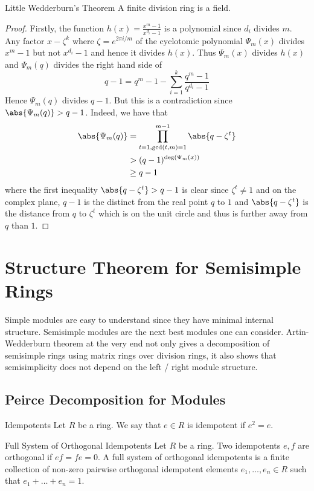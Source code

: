 \documentclass[a4paper]{article}
\begin{document}
\begin{thm}{Little Wedderburn's Theorem}{} A finite division ring is a field. \tcbline
\begin{proof}
Firstly, the function $h(x)=\frac{x^m-1}{x^{d_i}-1}$ is a polynomial since $d_i$ divides $m$. Any factor $x-\zeta^k$ where $\zeta=e^{2\pi i/m}$ of the cyclotomic polynomial $\Psi_m(x)$ divides $x^m-1$ but not $x^{d_i}-1$ and hence it divides $h(x)$. Thus $\Psi_m(x)$ divides $h(x)$ and $\Psi_m(q)$ divides the right hand side of $$q-1=q^m-1-\sum_{i=1}^k\frac{q^m-1}{q^{d_i}-1}$$ Hence $\Psi_m(q)$ divides $q-1$. But this is a contradiction since $\abs{\Psi_m(q)}>q-1$. Indeed, we have that 
\begin{align*}
\abs{\Psi_m(q)}&=\prod_{t=1,\gcd(t,m)=1}^{m-1}\abs{q-\zeta^t}\\
&>(q-1)^{\deg(\Psi_m(x))}\\
&\geq q-1
\end{align*}
where the first inequality $\abs{q-\zeta^t}>q-1$ is clear since $\zeta^t\neq 1$ and on the complex plane, $q-1$ is the distinct from the real point $q$ to $1$ and $\abs{q-\zeta^t}$ is the distance from $q$ to $\zeta^t$ which is on the unit circle and thus is further away from $q$ than $1$. 
\end{proof}
\end{thm}

\pagebreak
\section{Structure Theorem for Semisimple Rings}
Simple modules are easy to understand since they have minimal internal structure. Semisimple modules are the next best modules one can consider. Artin-Wedderburn theorem at the very end not only gives a decomposition of semisimple rings using matrix rings over division rings, it also shows that semisimplicity does not depend on the left / right module structure. 


\subsection{Peirce Decomposition for Modules}
\begin{defn}{Idempotents}{} Let $R$ be a ring. We say that $e\in R$ is idempotent if $e^2=e$. 
\end{defn}

\begin{defn}{Full System of Orthogonal Idempotents}{} Let $R$ be a ring. Two idempotents $e,f$ are orthogonal if $ef=fe=0$. A full system of orthogonal idempotents is a finite collection of non-zero pairwise orthogonal idempotent elements $e_1,\dots,e_n\in R$ such that $e_1+\dots+e_n=1$. 
\end{defn}
\end{document}
